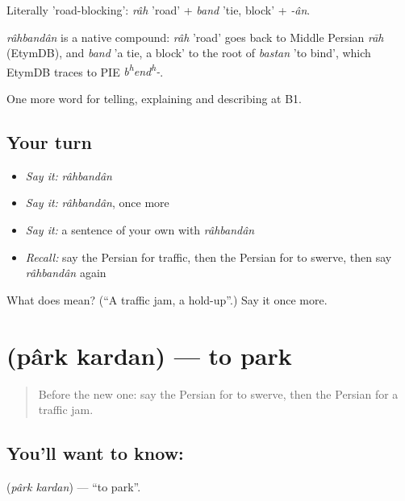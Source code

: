 Literally 'road-blocking': \emph{râh} 'road' + \emph{band} 'tie, block' + \emph{-ân}.

\begin{cousinweb}
\emph{râhbandân} is a native compound: \emph{râh} 'road' goes back to Middle Persian \emph{rāh} (EtymDB), and \emph{band} 'a tie, a block' to the root of \emph{bastan} 'to bind', which EtymDB traces to PIE \emph{b\textsuperscript{h}end\textsuperscript{h}-}.
\end{cousinweb}

\begin{grammarlens}[title={What you've built}]
One more word for telling, explaining and describing at B1.
\end{grammarlens}

\subsection*{Your turn}
\begin{itemize}
\raggedright
  \item \emph{Say it:} \emph{râhbandân}
  \item \emph{Say it:} \emph{râhbandân}, once more
  \item \emph{Say it:} a sentence of your own with \emph{râhbandân}
  \item \emph{Recall:} say the Persian for traffic, then the Persian for to swerve, then say \emph{râhbandân} again
\end{itemize}

\begin{tcolorbox}[breakable,colback=teal!4,colframe=teal!35!black,title={Before you move on}]
What does  mean? (\textquotedblleft{}A traffic jam, a hold-up\textquotedblright{}.) Say it once more.
\end{tcolorbox}
\section[\texorpdfstring{\fa{پارک} \fa{کردن} (pârk kardan)}{پارک کردن (pârk kardan)}]{  (pârk kardan) — to park}

\label{lesson:FA-C426-park-kardan}



\begin{quote}
Before the new one: say the Persian for to swerve, then the Persian for a traffic jam.
\end{quote}

\subsection*{You'll want to know:  }
\textbf{ } (\emph{pârk kardan}) — \textquotedblleft{}to park\textquotedblright{}.

